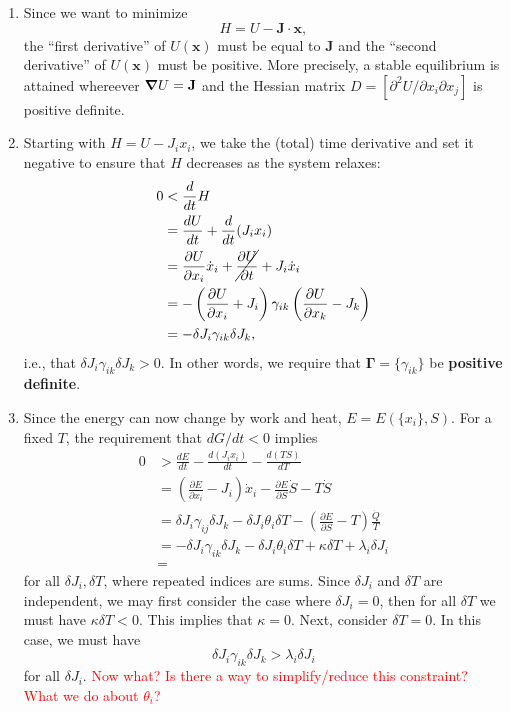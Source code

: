 \documentclass{article}
\theoremstyle{definition}
\newcommand{\p}{\partial}
\newcommand{\f}[2]{\frac{#1}{#2}}
\newcommand{\lp}{\left(}
\newcommand{\rp}{\right)}
\begin{document}
\begin{enumerate}[label=(\alph*)]
	\item Since we want to minimize  
	\begin{equation*}
	H = U - \mathbf{J}\cdot \mathbf{x},
	\end{equation*}
	the ``first derivative'' of $U(\mathbf{x})$ must be equal to $\mathbf{J}$ and the ``second derivative'' of $U(\mathbf{x})$ must be positive. More precisely, a stable equilibrium is attained whereever $\grad U = \mathbf{J}$ and the Hessian matrix $D = [\p^2 U /\p x_i \p x_j]$ is positive definite. 
	
	
	\item Starting with $H = U - J_i x_i$, we take the (total) time derivative and set it negative to ensure that $H$ decreases as the system relaxes:
	\begin{align*}
	0 &< \f{d}{dt}H \\
	&= \f{dU}{dt}   + \f{d}{dt}(J_i x_i) \\
	&= \f{\p U}{\p x_i}\dot{x}_i + \cancel{\f{\p U}{\p t}} + J_i \dot{x}_i\\
	&= -\lp \f{\p U}{\p x_i} + J_i \rp \gamma_{ik} \lp \f{\p U}{\p x_k} - J_k \rp\\
	&= -\delta J_i \gamma_{ik} \delta J_k,
	\end{align*}
	i.e., that $\delta J_i \gamma_{ik} \delta J_k > 0$. In other words, we require that $\mathbf{\Gamma} = \{ \gamma_{ik}\}$ be \textbf{positive definite}. 
	
	
	
	\item Since the energy can now change by work and heat, $E = E(\{x_i\},S)$. For a fixed $T$, the requirement that $dG/dt < 0$ implies
	\begin{align*}
	0 &>  \f{dE}{dt} -\f{d(J_i x_i)}{dt} - \f{d(TS)}{dT} \\
	&= \lp \f{\p E}{\p x_i} - J_i\rp \dot{x}_i - \f{\p E}{\p S}\dot{S} - T\dot{S} \\  
	&= \delta J_i \gamma_{ij} \delta J_k - \delta J_i \theta_i \delta T - \lp \f{\p E}{\p S} - T \rp \f{\dot{Q}}{T} \\
	&= -\delta J_i\gamma_{ik} \delta J_k - \delta J_i \theta_i \delta T + \kappa \delta T + \lambda_i \delta J_i\\
	&= 
	\end{align*}
	for all $\delta J_i, \delta T$, where repeated indices are sums. Since $\delta J_i$ and $\delta T$ are independent, we may first 
	consider the case where $\delta J_i = 0$, then for all $\delta T$ we must have $\kappa \delta T < 0$. This implies that $\boxed{\kappa = 0}$. Next, consider $\delta T =0$. In this case, we must have
	\begin{equation*}
	\delta J_i \gamma_{ik} \delta J_k > \lambda_i \delta J_i
	\end{equation*}
	for all $\delta J_i$. \textcolor{red}{Now what? Is there a way to simplify/reduce this constraint? What we do about $\theta_i$?}
\end{enumerate}
\end{document}
